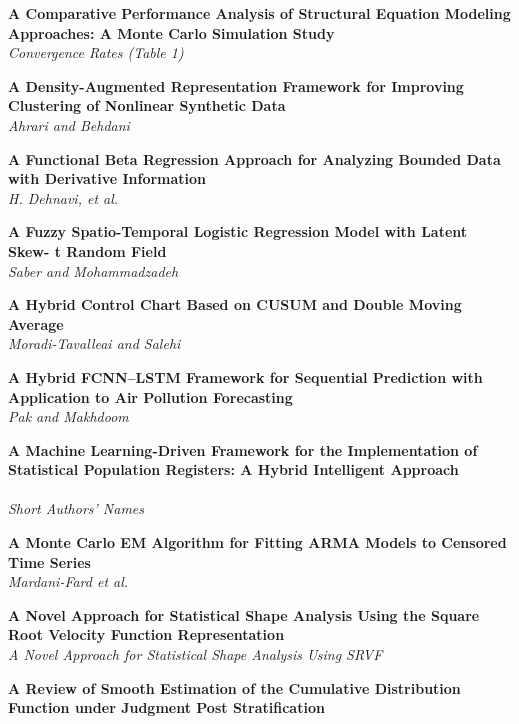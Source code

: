 
\noindent
{\bf
A Comparative Performance Analysis of Structural Equation Modeling Approaches: A Monte Carlo Simulation Study
}\dotfill \pageref{p.1022}\\
{\small \it
Convergence Rates (Table 1)
}


\noindent
{\bf
A Density-Augmented Representation Framework for Improving Clustering of Nonlinear Synthetic Data
}\dotfill \pageref{p.1285}\\
{\small \it
Ahrari and Behdani
}


\noindent
{\bf
A Functional Beta Regression Approach for Analyzing Bounded Data with Derivative Information
}\dotfill \pageref{p.1143}\\
{\small \it
H. Dehnavi, et al.
}


\noindent
{\bf
A Fuzzy Spatio-Temporal Logistic Regression Model with Latent Skew- t Random Field
}\dotfill \pageref{p.1235}\\
{\small \it
Saber and Mohammadzadeh
}


\noindent
{\bf
A Hybrid Control Chart Based on CUSUM and Double Moving Average
}\dotfill \pageref{p.1247}\\
{\small \it
Moradi-Tavalleai and Salehi
}


\noindent
{\bf
A Hybrid FCNN–LSTM Framework for Sequential Prediction with Application to Air Pollution Forecasting
}\dotfill \pageref{p.1163}\\
{\small \it
Pak and Makhdoom
}


\noindent
{\bf
A Machine Learning-Driven Framework for the Implementation of Statistical Population Registers: A Hybrid Intelligent Approach\\
}\dotfill \pageref{p.1129}\\
{\small \it
Short Authors' Names
}


\noindent
{\bf
A Monte Carlo EM Algorithm for Fitting ARMA Models to Censored Time Series
}\dotfill \pageref{p.1053}\\
{\small \it
Mardani-Fard et al.
}


\noindent
{\bf
A Novel Approach for Statistical Shape Analysis Using the Square Root Velocity Function Representation
}\dotfill \pageref{p.1057}\\
{\small \it
A Novel Approach for Statistical Shape Analysis Using SRVF
}


\noindent
{\bf
A Review of Smooth Estimation of the Cumulative Distribution Function under Judgment Post Stratification
}\dotfill \pageref{p.1347}\\
{\small \it

}


